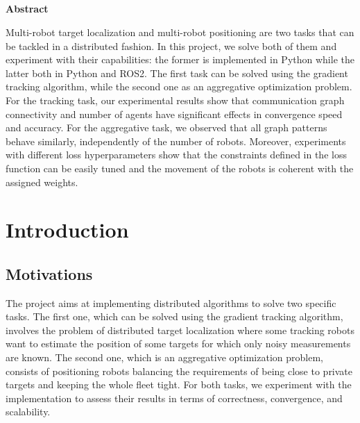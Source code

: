 \documentclass[a4paper,11pt,oneside]{book}
\begin{document}
\newpage
\thispagestyle{empty}

\begin{center}
\chapter*{}
\thispagestyle{empty}
{\Huge \textbf{Abstract}}\\
\vspace{15mm}
\end{center}

Multi-robot target localization and multi-robot positioning are two tasks that can be tackled in a distributed fashion. In this project, we solve both of them and experiment with their capabilities: the former is implemented in Python while the latter both in Python and ROS2. The first task can be solved using the gradient tracking algorithm, while the second one as an aggregative optimization problem. For the tracking task, our experimental results show that communication graph connectivity and number of agents have significant effects in convergence speed and accuracy. For the aggregative task, we observed that all graph patterns behave similarly, independently of the number of robots. Moreover, experiments with different loss hyperparameters show that the constraints defined in the loss function can be easily tuned and the movement of the robots is coherent with the assigned weights.

\tableofcontents \thispagestyle{empty}

\chapter*{Introduction}

\section*{Motivations} 

The project aims at implementing distributed algorithms to solve two specific tasks. The first one, which can be solved using the gradient tracking algorithm, involves the problem of distributed target localization where some tracking robots want to estimate the position of some targets for which only noisy measurements are known. The second one, which is an aggregative optimization problem, consists of positioning robots balancing the requirements of being close to private targets and keeping the whole fleet tight. For both tasks, we experiment with the implementation to assess their results in terms of correctness, convergence, and scalability.
\end{document}
